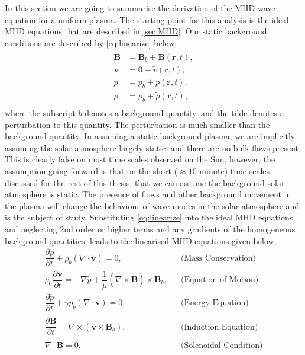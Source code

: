 \documentclass[a4paper,12pt,fourier,authoryear,custommargin]{Classes/PhDThesisPSnPDF}
\renewcommand{\vec}{\mathbf}
\begin{document}
In this section we are going to summarise the derivation of the MHD wave equation for a uniform plasma.
The starting point for this analysis is the ideal MHD equations that are described in \cref{sec:MHD}.
Our static background conditions are described by \cref{eq:linearize} below,
\begin{equation}\label{eq:linearize}
    \begin{aligned}                                                    
        \vec{B} &= \vec{B}_b + \tilde{\vec{B}}(\vec{r},t),\\
        \vec{v} &= \vec{0} + \tilde{{v}}(\vec{r},t),\\
        p &= p_b + \tilde{p}(\vec{r},t),\\
        \rho &= \rho_b + {\tilde{\rho}}(\vec{r},t),\\
    \end{aligned}
\end{equation}
where the subscript $b$ denotes a background quantity, and the tilde denotes a perturbation to this quantity.
The perturbation is much smaller than the background quantity.
In assuming a static background plasma, we are implicitly assuming the solar atmosphere largely static, and there are no bulk flows present.
This is clearly false on most time scales observed on the Sun, however, the assumption going forward is that on the short ($\approx 10$ minute) time scales discussed for the rest of this thesis, that we can assume the background solar atmosphere is static.
The presence of flows and other background movement in the plasma will change the behaviour of wave modes in the solar atmosphere and is the subject of study. %
Substituting \cref{eq:linearize} into the ideal MHD equations and neglecting 2nd order or higher terms and any gradients of the homogeneous background quantities, leads to the linearised MHD equations given below,
\begin{align}                                                         
    \dfrac{\partial \tilde{\rho} }{\partial t} + \rho_b (\nabla \cdot \tilde{\vec{v}}) =       
    0,
    &&\text{(Mass Conservation)}\label{eq:lmhd_mass}\\
    \rho_0 \dfrac{\partial \tilde{\vec{v}}}{\partial t} =
    -\nabla \tilde{p} + \dfrac{1}{\mu}(\nabla \times \tilde{\vec{B}}) \times \vec{B}_b,
    &&\text{(Equation of Motion)}\label{eq:lmhd_motion}\\
    \dfrac{\partial \tilde{p}}{\partial t} + \gamma p_b \left( \nabla \cdot \tilde{\vec{v}} \right) = 0,
    &&\text{(Energy Equation)}\label{eq:lmhd_energy}\\
    \dfrac{\partial \tilde{\vec{B}}}{\partial t} = \nabla \times (\tilde{\vec{v}} \times \vec{B}_b),
    &&\text{(Induction Equation)}\label{eq:lmhd_induction}\\
    \nabla \cdot \tilde{\vec{B}} = 0.
    &&\text{(Solenoidal Condition)}\label{eq:lmhd_solenoid}              
\end{align}
\end{document}
